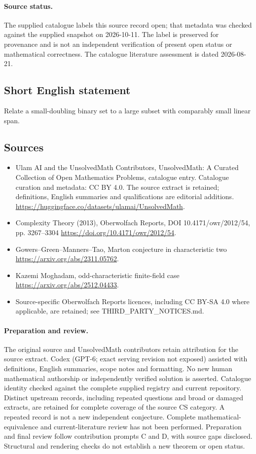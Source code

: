 \documentclass[11pt]{article}
\begin{document}
\paragraph{Source status.}
The supplied catalogue labels this source record open; that metadata was checked against the supplied snapshot on 2026-10-11. The label is preserved for provenance and is not an independent verification of present open status or mathematical correctness. The catalogue literature assessment is dated 2026-08-21.
\subsection{Short English statement}
Relate a small-doubling binary set to a large subset with comparably small linear span.
\subsection{Sources}
\begin{itemize}
\item[\hypertarget{source:statement:1}{S1}] Ulam AI and the UnsolvedMath Contributors, UnsolvedMath: A Curated Collection of Open Mathematics Problems, catalogue entry. Catalogue curation and metadata: CC BY 4.0. The source extract is retained; definitions, English summaries and qualifications are editorial additions.
\url{https://huggingface.co/datasets/ulamai/UnsolvedMath}.
\item[\hypertarget{source:statement:2}{S2}] Complexity Theory (2013), Oberwolfach Reports, DOI 10.4171/owr/2012/54, pp. 3267--3304
\url{https://doi.org/10.4171/owr/2012/54}.
\item[\hypertarget{source:statement:3}{S3}] Gowers--Green--Manners--Tao, Marton conjecture in characteristic two
\url{https://arxiv.org/abs/2311.05762}.
\item[\hypertarget{source:statement:4}{S4}] Kazemi Moghadam, odd-characteristic finite-field case
\url{https://arxiv.org/abs/2512.04433}.
\item Source-specific Oberwolfach Reports licences, including CC BY-SA 4.0 where applicable, are retained; see THIRD\_PARTY\_NOTICES.md.
\end{itemize}
\paragraph{Preparation and review.}
The original source and UnsolvedMath contributors retain attribution for the source extract. Codex (GPT-6; exact serving revision not exposed) assisted with definitions, English summaries, scope notes and formatting. No new human mathematical authorship or independently verified solution is asserted. Catalogue identity checked against the complete supplied registry and current repository. Distinct upstream records, including repeated questions and broad or damaged extracts, are retained for complete coverage of the source CS category. A repeated record is not a new independent conjecture. Complete mathematical-equivalence and current-literature review has not been performed. Preparation and final review follow contribution prompts C and D, with source gaps disclosed. Structural and rendering checks do not establish a new theorem or open status.
\label{end:statement}
\end{document}

